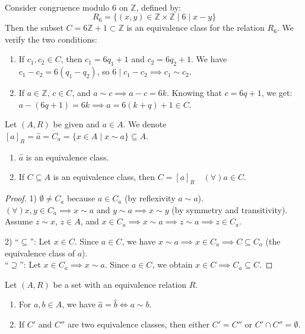 \begin{example}\mbox{}\\
Consider congruence modulo 6 on $\mathbb{Z}$, defined by:
$$ R_6 = \{(x, y) \in \mathbb{Z} \times \mathbb{Z} \mid 6 \mid x - y\} $$
Then the subset $C = 6\mathbb{Z} + 1 \subset \mathbb{Z}$ is an equivalence class for the relation $R_6$. We verify the two conditions:
\begin{enumerate}
    \item If $c_1, c_2 \in C$, then $c_1 = 6q_1 + 1$ and $c_2 = 6q_2 + 1$. We have $c_1 - c_2 = 6(q_1 - q_2)$, so $6 \mid c_1 - c_2 \implies c_1 \sim c_2$.
    \item If $a \in \mathbb{Z}$, $c \in C$, and $a \sim c \implies a - c = 6k$. Knowing that $c = 6q + 1$, we get: \\
    $a - (6q + 1) = 6k \implies a = 6(k + q) + 1 \in C$.
\end{enumerate}
\end{example}


\vspace{1em}
Let $(A, R)$ be given and $a \in A$. We denote $[a]_R = \hat{a} = C_a = \{x \in A \mid x \sim a\} \subseteq A$.

\begin{proposition}
\begin{enumerate}
    \item $\hat{a}$ is an equivalence class.
    \item If $C \subseteq A$ is an equivalence class, then $C = [a]_R \quad (\forall) a \in C$.
\end{enumerate}
\end{proposition}

\begin{proof}
1) $\emptyset \neq C_a$ because $a \in C_a$ (by reflexivity $a \sim a$). \\
$(\forall) x, y \in C_a \implies x \sim a$ and $y \sim a \implies x \sim y$ (by symmetry and transitivity). \\
Assume $z \sim x$, $z \in A$, and $x \in C_a \implies x \sim a \implies z \sim a \implies z \in C_a$.

2) ``$\subseteq$'': Let $x \in C$. Since $a \in C$, we have $x \sim a \implies x \in C_a \implies C \subseteq C_a$ (the equivalence class of $a$). \\
``$\supseteq$'': Let $x \in C_a \implies x \sim a$. Since $a \in C$, we obtain $x \in C \implies C_a \subseteq C$.
\end{proof}

\begin{proposition}
Let $(A, R)$ be a set with an equivalence relation $R$.
\begin{enumerate}
    \item For $a, b \in A$, we have $\hat{a} = \hat{b} \iff a \sim b$.
    \item If $C'$ and $C''$ are two equivalence classes, then either $C' = C''$ or $C' \cap C'' = \emptyset$.
\end{enumerate}
\end{proposition}

